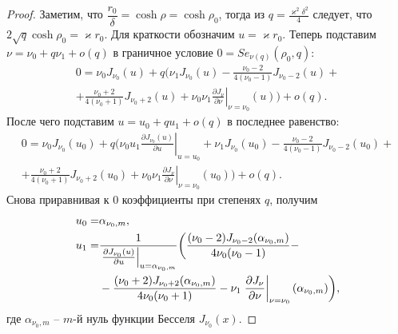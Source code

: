 \begin{proof}
Заметим, что $\dfrac{r_0}{\delta} = \cosh \rho = \cosh \rho_0 $, тогда из  $q = \frac{\varkappa^2 \delta^2}{4}$ следует, что $2\sqrt{q} \cosh{\rho_0} =   \varkappa r_0$. 
Для краткости обозначим $u = \varkappa r_0$. Теперь подставим  
$\nu=\nu_0 + q\nu_1 + o(q)$ в граничное условие $0 = Se_{\nu(q)}(\rho_0, q)$:
\begin{multline*}
0 = \nu_0 J_{\nu_0}(u) + q \bigg(  \nu_1 J_{\nu_0}(u) 
- \frac{\nu_0 - 2}{4(\nu_0-1)} J_{\nu_0-2}(u) + %
\\ %
+ \frac{\nu_0 + 2}{4(\nu_0+1)} J_{\nu_0+2}(u) +
 \nu_0 \nu_1 \left.\frac{\partial J_\nu}{\partial \nu}\right|_{\nu = \nu_0}(u)
\bigg) + o(q).
\end{multline*}
После чего подставим   $u = u_0 + q u_1 + o(q)$ в последнее равенство:
\begin{multline*}
0 = \nu_0 J_{\nu_0}(u_0) + q \bigg( 
\nu_0 u_1 \left.\frac{\partial J_{\nu_0}(u)}{\partial u}\right|_{u=u_0} 
+\nu_1 J_{\nu_0}(u_0) - \frac{\nu_0 - 2}{4(\nu_0-1)} J_{\nu_0-2}(u_0) +\\ 
+\frac{\nu_0 + 2}{4(\nu_0+1)} J_{\nu_0+2}(u_0) 
+ \nu_0 \nu_1 \left.\frac{\partial J_\nu}{\partial \nu}\right|_{\nu = \nu_0}(u_0)
\bigg) + o(q).
\end{multline*}
Снова приравнивая к $0$ коэффициенты при степенях  $q$, получим
\begin{align}
    u_0 =& \alpha_{\nu_0, m}, \label{eq:u0}\\
    u_1 =& \frac{1}{\left.\frac{\partial J_{\nu_0}(u)}{\partial u}\right|_{u=\alpha_{\nu_0, m}} } \biggl(
\frac{(\nu_0 - 2)J_{\nu_0-2}(\alpha_{\nu_0, m}) }{4 \nu_0(\nu_0-1)} - \notag \\    
&{}- \frac{(\nu_0 + 2)J_{\nu_0+2}(\alpha_{\nu_0, m}) }{4 \nu_0(\nu_0+1)} - \nu_1 \left.\frac{\partial J_\nu}{\partial \nu}\right|_{\nu = \nu_0}(\alpha_{\nu_0, m})
    \biggr),\label{eq:u1}
\end{align}
где $\alpha_{\nu_0, m}$ --  $m$-й нуль функции Бесселя $J_{\nu_0}(x)$. 





\end{proof}

